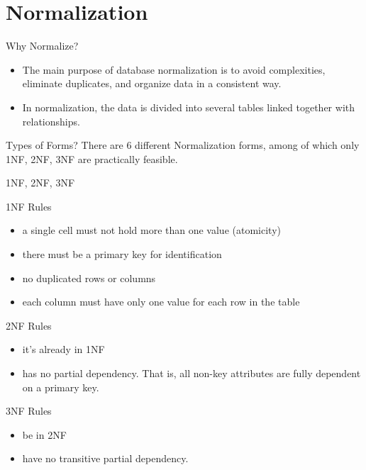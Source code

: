 \documentclass[12pt, aspectratio=169]{beamer}
\begin{document}
\section{Normalization}
\begin{frame} {Why Normalize?}
    \begin{itemize}
        \item The main purpose of database normalization is to avoid complexities, eliminate duplicates, and organize data in a consistent way. 
        \item In normalization, the data is divided into several tables linked together with relationships.
    \end{itemize}
    \begin{alertblock}{Types of Forms?}
    There are 6 different Normalization forms, among of which only 1NF, 2NF, 3NF are practically feasible.
    \end{alertblock}
\end{frame}
\begin{frame}[allowframebreaks]{1NF, 2NF, 3NF}
    \begin{block}{1NF Rules}
        \begin{itemize}
            \item a single cell must not hold more than one value (atomicity)
            \item there must be a primary key for identification
            \item no duplicated rows or columns
            \item each column must have only one value for each row in the table
        \end{itemize}
    \end{block}
    \begin{block}{2NF Rules}
        \begin{itemize}
            \item it’s already in 1NF
            \item has no partial dependency. That is, all non-key attributes are fully dependent on a primary key.
        \end{itemize}
    \end{block}
    \begin{block}{3NF Rules}
        \begin{itemize}
            \item be in 2NF
            \item have no transitive partial dependency.
        \end{itemize}
    \end{block}
\end{frame}
\end{document}
